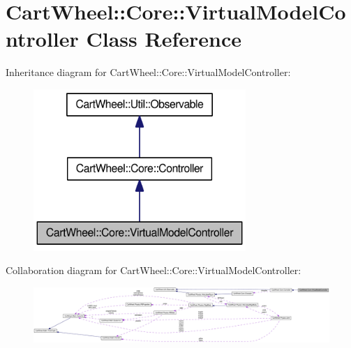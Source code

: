 \hypertarget{classCartWheel_1_1Core_1_1VirtualModelController}{
\section{CartWheel::Core::VirtualModelController Class Reference}
\label{classCartWheel_1_1Core_1_1VirtualModelController}
}


Inheritance diagram for CartWheel::Core::VirtualModelController:\nopagebreak
\begin{figure}[H]
\begin{center}
\leavevmode
\includegraphics[width=228pt]{classCartWheel_1_1Core_1_1VirtualModelController__inherit__graph}
\end{center}
\end{figure}


Collaboration diagram for CartWheel::Core::VirtualModelController:\nopagebreak
\begin{figure}[H]
\begin{center}
\leavevmode
\includegraphics[width=400pt]{classCartWheel_1_1Core_1_1VirtualModelController__coll__graph}
\end{center}
\end{figure}
